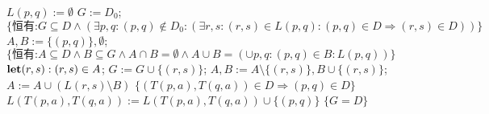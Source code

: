 \begin{algorithm}
    \caption{}\label{al:4-7}
    \small
    \begin{algorithmic}[1]
            \State $ L(p,q) := \emptyset $ 
        \EndFor
        \State $G:=D_0$; 
        \State $\{ \mbox{恒有:} G \subseteq D \land ( \exists p,q:(p,q)\not\in D_0:(\exists r,s:(r,s)\in L(p,q):(p,q)\in D\Rightarrow (r,s)\in D ))\}$
                \State $A,B:=\{  (p,q) \}, \emptyset  $;
                \State $ \{ \mbox{恒有:} A \subseteq D \land B \subseteq G \land A \cap B = \emptyset \land A \cup B = ( \cup p,q:(p,q) \in B : L(p,q) ) \} $
                    \State $ \mbox{\textbf{let}} (r,s):(r,s) \in A $;
                    \State $ G:=G\cup \{ (r,s) \} $; 
                    \State $ A,B := A \setminus \{ (r,s) \}, B \cup \{ (r,s) \} $;
                    \State $ A := A \cup ( L(r,s) \setminus B ) $ 
                \Until
                    \State $ \{ (T(p,a),T(q,a)) \in D  \Rightarrow (p,q) \in D \} $
                    \State $ L( T(p,a),T(q,a) ) := L( T(p,a),T(q,a) ) \cup \{ (p,q)\} $
                \EndFor
            \EndIf
        \EndFor $\{ G=D \} $
    \end{algorithmic}
\end{algorithm}

